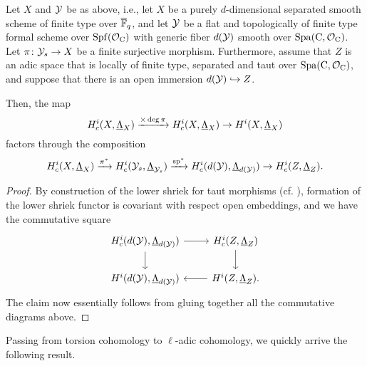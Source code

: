 \documentclass[../main.tex]{subfiles}
\begin{document}
\begin{prop}\label{thm:SubspaceInjectionFiniteLevel}
  Let $X$ and $\mathcal{Y}$ be as above, i.e., let $X$ be a purely $d$-dimensional
  separated smooth scheme of finite type over ${\overline {\mathbb{F}}_q}$, and let 
  $\mathcal{Y}$ be a flat and topologically of finite type formal scheme over
  $\operatorname{Spf}(\mathcal{O}_{\mathrm{C}})$ with generic fiber $d(\mathcal{Y})$ smooth over $\operatorname{Spa}({\mathrm{C}},\mathcal{O}_{\mathrm{C}})$.
  Let $\pi\colon \mathcal{Y}_s \to X$ be a finite surjective morphism.
  Furthermore, assume that 
  $Z$ is an adic space that is locally of finite type, separated and taut
  over $\operatorname{Spa}({\mathrm{C}}, \mathcal{O}_{\mathrm{C}})$, and suppose that there is an open immersion
  $d(\mathcal{Y}) \hookrightarrow Z$.

  Then, the map 
  \begin{equation*}
    H_c^i(X, \underline \Lambda_X) \xrightarrow{\times \deg \pi} 
    H_c^i(X, \underline \Lambda_X) \to 
    H^i(X,   \underline \Lambda_X)
  \end{equation*}
  factors through the composition
  \begin{equation*}
    H_c^i(X,      \underline \Lambda_X) \xrightarrow{\pi^*}
    H_c^i(\mathcal{Y}_s,  \underline \Lambda_{\mathcal{Y}_s}) \xrightarrow{\mathrm{sp}^*}
    H_c^i(d(\mathcal{Y}), \underline \Lambda_{d(\mathcal{Y})}) \to 
    H_c^i(Z,      \underline \Lambda_Z).
  \end{equation*}
\begin{proof}
  By construction of the lower shriek for taut morphisms (cf. \cite[Section 0.4
  D)]{huber2013etale}), formation of the lower shriek functor is covariant with
  respect open embeddings, and we have the commutative square
  \begin{equation*}
    \begin{tikzcd}[ampersand replacement=\&]
      {\hH^i_c(d(\cY), \underline \Lambda_{d(\cY)})} \& 
      {\hH^i_c(Z, \underline \Lambda_{Z})} \\
    	{\hH^i(d(\cY), \underline \Lambda_{d(\cY)})} \& 
      {\hH^i(Z, \underline \Lambda_{Z})}.
    	\arrow[from=1-1, to=1-2]
    	\arrow[from=1-1, to=2-1]
    	\arrow[from=1-2, to=2-2]
    	\arrow[from=2-2, to=2-1]
    \end{tikzcd}
  \end{equation*}
  The claim now essentially follows from gluing together all the commutative
  diagrams above. 
\end{proof}
\end{prop}

Passing from torsion cohomology to $\ell$-adic cohomology, we quickly arrive
the following result.
\end{document}
